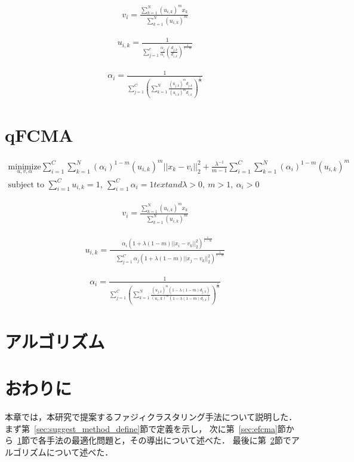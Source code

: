\documentclass[a4j,12pt,dvipdfmx,oneside]{jsbook}
\theoremstyle{definition}
\begin{document}
\begin{align}
   v_{i}=\frac{\sum_{k=1}^N(u_{i,k})^mx_{k}}{\quad\sum_{k=1}^N(u_{i,k})^{m}}
\end{align}

\begin{align}
   u_{i,k}=\frac{1}{\sum_{j=1}^c\frac{\alpha_{j}}{\alpha_{i}}\left(\frac{d_{j,k}}{d_{i,k}}\right)^\frac{1}{1-m}}
\end{align}

\begin{align}
    \alpha_{i}=\frac{1}{\sum_{j=1}^C\left(\sum_{k=1}^N\frac{(u_{j,k})^md_{j,k}}{(u_{i,k})^md_{i,k}}\right)^{\frac{1}{m}}}
\end{align}
  
\section{qFCMA}\label{sec:qfcma}
%
\begin{align}
 \underset{u,v,\alpha}{\text{minimize}}
 \sum_{i=1}^C\sum_{k=1}^N(\alpha_{i})^{1-m}(u_{i,k})^m||x_k-v_i||_2^2
 +\frac{\lambda^{-1}}{m-1}\sum_{i=1}^C\sum_{k=1}^N(\alpha_{i})^{1-m}(u_{i,k})^m\\
 {\text{subject to }}\sum_{i=1}^Cu_{i,k}=1,~\sum_{i=1}^C\alpha_{i}=1{text{ and }}\lambda>0,~m>1,~\alpha_{i}>0
\end{align}

\begin{align}
  v_{i}=\frac{\sum_{k=1}^N(u_{i,k})^mx_{k}}{\quad\sum_{k=1}^N(u_{i,k})^{m}}
\end{align}
    
\begin{align}
  u_{i,k}=\frac{\alpha_{i}(1+\lambda(1-m)||x_i-v_k||_2^2)^\frac{1}{1-m}}{\quad\sum_{j=1}^C\alpha_{j}(1+\lambda(1-m)||x_j-v_k||_2^2)^\frac{1}{1-m}}
\end{align}

\begin{align}
 \alpha_{i}=\frac{1}{\sum_{j=1}^C\left(\sum_{k=1}^N\frac{(u_{j,k})^m(1-\lambda(1-m)d_{j,k})}{(u_i,k)^m(1-\lambda(1-m)d_{i,k})}\right)^{\frac{1}{m}}}
\end{align}
   
\section{アルゴリズム}\label{sec:suggest_algorythm}
%
\section{おわりに}\label{sec:suggest_method_summary}
本章では，本研究で提案するファジィクラスタリング手法について説明した．
まず第~\ref{sec:suggest_method_define}節で定義を示し，
次に第~\ref{sec:efcma}節から~\ref{sec:qfcma}節で各手法の最適化問題と，その導出について述べた．
最後に第~\ref{sec:suggest_algorythm}節でアルゴリズムについて述べた．
%
%
%
\end{document}
